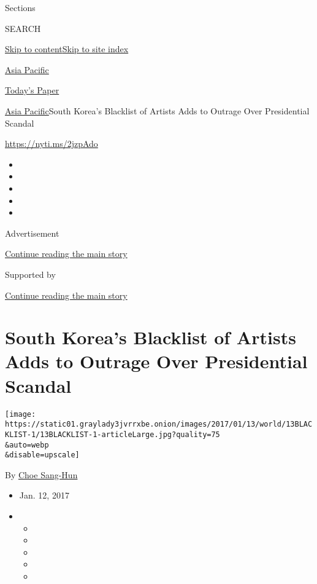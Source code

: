 Sections

SEARCH

\protect\hyperlink{site-content}{Skip to
content}\protect\hyperlink{site-index}{Skip to site index}

\href{https://www.nytimes3xbfgragh.onion/section/world/asia}{Asia
Pacific}

\href{https://myaccount.nytimes3xbfgragh.onion/auth/login?response_type=cookie\&client_id=vi}{}

\href{https://www.nytimes3xbfgragh.onion/section/todayspaper}{Today's
Paper}

\href{/section/world/asia}{Asia Pacific}\textbar{}South Korea's
Blacklist of Artists Adds to Outrage Over Presidential Scandal

\url{https://nyti.ms/2jzpAdo}

\begin{itemize}
\item
\item
\item
\item
\item
\end{itemize}

Advertisement

\protect\hyperlink{after-top}{Continue reading the main story}

Supported by

\protect\hyperlink{after-sponsor}{Continue reading the main story}

\hypertarget{south-koreas-blacklist-of-artists-adds-to-outrage-over-presidential-scandal}{%
\section{South Korea's Blacklist of Artists Adds to Outrage Over
Presidential
Scandal}\label{south-koreas-blacklist-of-artists-adds-to-outrage-over-presidential-scandal}}

\texttt{[image: https://static01.graylady3jvrrxbe.onion/images/2017/01/13/world/13BLACKLIST-1/13BLACKLIST-1-articleLarge.jpg?quality=75\\\&auto=webp\\\&disable=upscale]}

By \href{http://www.nytimes3xbfgragh.onion/by/choe-sang-hun}{Choe
Sang-Hun}

\begin{itemize}
\item
  Jan. 12, 2017
\item
  \begin{itemize}
  \item
  \item
  \item
  \item
  \item
  \end{itemize}
\end{itemize}

